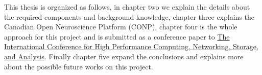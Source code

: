  


This thesis is organized as follows, in chapter two we explain the details about the required components and background knowledge, chapter three explains the Canadian Open Neuroscience Platform (CONP), chapter four is the whole approach for this project and is submitted as a conference paper to \href{https://supercomputing.org/}{The International Conference for High Performance Computing, Networking, Storage, and Analysis}. Finally chapter five expand the conclusions and explains more about the possible future works on this project.


